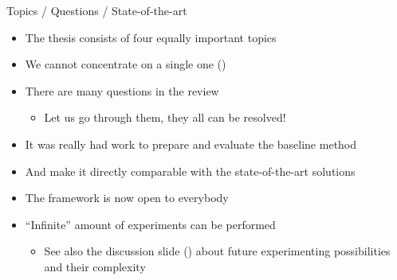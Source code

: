 \documentclass[xcolor=dvipsnames]{beamer}
\begin{document}
\begin{frame}{Topics / Questions / State-of-the-art}
\begin{itemize}
	\item The thesis consists of \alert{four equally important topics}
	\item We cannot concentrate on a single one ()
	\bigskip
	\item There are many questions in the review
	\begin{itemize}
		\item Let us go through them, \alert{they all can be resolved!}
	\end{itemize}
	\bigskip
	\item It was really had work to prepare and evaluate the baseline method
	\item And make it \alert{directly comparable} with the state-of-the-art solutions
	\item The framework is now open to everybody
	\item ``Infinite'' amount of experiments can be performed
	\begin{itemize}
		\item See also the discussion slide (\pageref{future_experiments}) about future experimenting possibilities and their \alert{complexity}
	\end{itemize}
\end{itemize}
\end{frame}
\resetcolor
\end{document}
